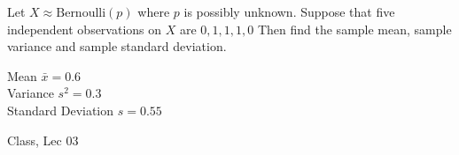 \begin{samepage}
\begin{ex}
Let $X \approx \text{Bernoulli}\left (p\right )$ where $p$ is possibly unknown. Suppose that five independent observations on $X$ are $0,1,1,1,0$ Then find the sample mean, sample variance and sample standard deviation.
\end{ex}
\begin{ans}
Mean $\bar{x} = 0.6$\\
Variance $s^2 = 0.3$ \\
Standard Deviation $s = 0.55$ 
\end{ans}
\begin{source}
Class, Lec 03
\end{source}
\end{samepage}
